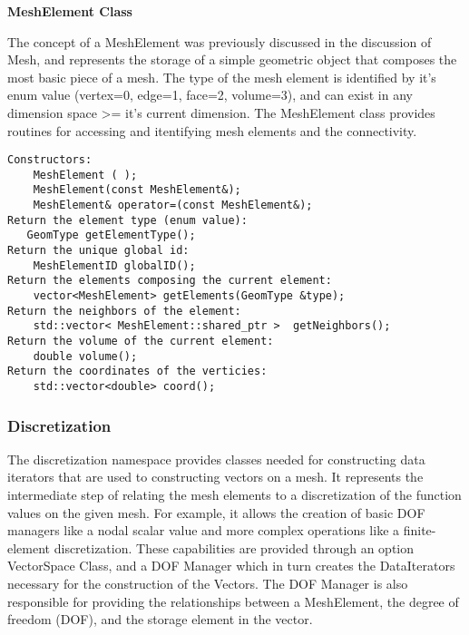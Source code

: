 \documentclass[10pt]{article}
\newenvironment{codelisting}
{\begin{list}{}{\setlength{\leftmargin}{2em}}\item\scriptsize\normalsize}
{\end{list}}
\begin{document}
\vspace{6 mm}\noindent\textbf{MeshElement Class}

The concept of a MeshElement was previously discussed in the discussion of Mesh, and represents the storage of a simple geometric object that composes the most basic piece of a mesh.  The type of the mesh element is identified by it's enum value (vertex=0, edge=1, face=2, volume=3), and can exist in any dimension space >= it's current dimension.  The MeshElement class provides routines for accessing and itentifying mesh elements and the connectivity.
\begin{codelisting}
\begin{verbatim}
Constructors:
    MeshElement ( );
    MeshElement(const MeshElement&);
    MeshElement& operator=(const MeshElement&);
Return the element type (enum value):
   GeomType getElementType();
Return the unique global id:
    MeshElementID globalID();
Return the elements composing the current element:
    vector<MeshElement> getElements(GeomType &type);
Return the neighbors of the element:
    std::vector< MeshElement::shared_ptr >  getNeighbors();
Return the volume of the current element:
    double volume();
Return the coordinates of the verticies:
    std::vector<double> coord();
\end{verbatim}
\end{codelisting}



\subsubsection{Discretization}

The discretization namespace provides classes needed for constructing data iterators that are used to constructing vectors on a mesh.  It represents the intermediate step of relating the mesh elements to a discretization of the function values on the given mesh.  For example, it allows the creation of basic DOF managers like a nodal scalar value and more complex operations like a finite-element discretization.  These capabilities are provided through an option VectorSpace Class, and a DOF Manager which in turn creates the DataIterators necessary for the construction of the Vectors.  The DOF Manager is also responsible for providing the relationships between a MeshElement, the degree of freedom (DOF), and the storage element in the vector.  
\end{document}
